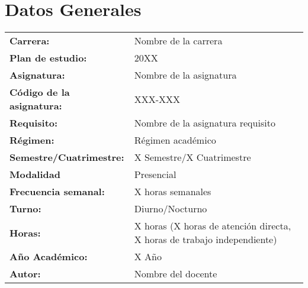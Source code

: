 \section{Datos Generales}
\begin{doublespace}
    \begin{tabularx}{\linewidth}{@{}>{\bfseries}l X@{}}
        Carrera:                 & Nombre de la carrera                                                    \\
        Plan de estudio:         & 20XX                                                                    \\
        Asignatura:              & Nombre de la asignatura                                                 \\
        Código de la asignatura: & XXX-XXX                                                                 \\
        Requisito:               & Nombre de la asignatura requisito                                       \\
        Régimen:                 & Régimen académico                                                       \\
        Semestre/Cuatrimestre:   & X Semestre/X Cuatrimestre                                               \\
        Modalidad                & Presencial                                                              \\
        Frecuencia semanal:      & X horas semanales                                                       \\
        Turno:                   & Diurno/Nocturno                                                         \\
        Horas:                   & X horas (X horas de atención directa, X horas de trabajo independiente) \\
        Año Académico:           & X Año                                                                   \\
        Autor:                   & Nombre del docente                                                      \\
    \end{tabularx}
\end{doublespace}
\pagebreak